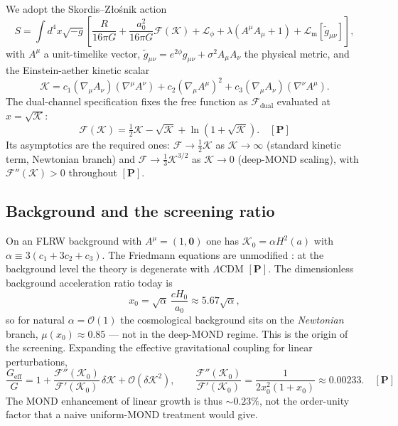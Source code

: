 \documentclass[aps,prd,preprint,superscriptaddress,nofootinbib,amsmath,amssymb,floatfix]{revtex4-2}
\makeatletter
\DeclareRobustCommand{\_}{%
    \ifmmode\nfss@text{\textunderscore}\else\textunderscore\penalty\z@\fi}%
\makeatother
\begin{document}
We adopt the Skordis--Z\l{}o\'snik action \cite{SkordisZlosnik2021}
\begin{equation}
\label{eq:rmond}
S = \int d^4x\sqrt{-g}\left[\frac{R}{16\pi G} + \frac{a_0^2}{16\pi G}\mathcal{F}(\mathcal{K}) + \mathcal{L}_\phi + \lambda(A^\mu A_\mu + 1) + \mathcal{L}_{\text{m}}[\tilde g_{\mu\nu}]\right],
\end{equation}
with $A^\mu$ a unit-timelike vector, $\tilde g_{\mu\nu} = e^{2\phi}g_{\mu\nu} + \sigma^2 A_\mu A_\nu$ the physical metric, and the Einstein-aether kinetic scalar
\begin{equation}
\mathcal{K} = c_1(\nabla_\mu A_\nu)(\nabla^\mu A^\nu) + c_2(\nabla_\mu A^\mu)^2 + c_3(\nabla_\mu A_\nu)(\nabla^\nu A^\mu).
\end{equation}
The dual-channel specification fixes the free function as $\mathcal{F}_{\text{dual}}$ evaluated at $x = \sqrt{\mathcal{K}}$:
\begin{equation}
\label{eq:Fk}
\mathcal{F}(\mathcal{K}) = \tfrac{1}{2}\mathcal{K} - \sqrt{\mathcal{K}} + \ln\!\left(1+\sqrt{\mathcal{K}}\right). \quad \mathbf{[P]}
\end{equation}
Its asymptotics are the required ones: $\mathcal{F}\to\tfrac{1}{2}\mathcal{K}$ as $\mathcal{K}\to\infty$ (standard kinetic term, Newtonian branch) and $\mathcal{F}\to\tfrac{1}{3}\mathcal{K}^{3/2}$ as $\mathcal{K}\to0$ (deep-MOND scaling), with $\mathcal{F}''(\mathcal{K})>0$ throughout $\mathbf{[P]}$.

\subsection{Background and the screening ratio}

On an FLRW background with $A^\mu = (1,\mathbf{0})$ one has $\mathcal{K}_0 = \alpha H^2(a)$ with $\alpha \equiv 3(c_1+3c_2+c_3)$. The Friedmann equations are unmodified \cite{Thomas2023}: at the background level the theory is degenerate with $\Lambda$CDM $\mathbf{[P]}$. The dimensionless background acceleration ratio today is
\begin{equation}
x_0 = \sqrt{\alpha}\,\frac{cH_0}{a_0} \approx 5.67\sqrt{\alpha},
\end{equation}
so for natural $\alpha = \mathcal{O}(1)$ the cosmological background sits on the \emph{Newtonian} branch, $\mu(x_0)\approx0.85$ --- not in the deep-MOND regime. This is the origin of the screening. Expanding the effective gravitational coupling for linear perturbations,
\begin{equation}
\frac{G_{\text{eff}}}{G} = 1 + \frac{\mathcal{F}''(\mathcal{K}_0)}{\mathcal{F}'(\mathcal{K}_0)}\,\delta\mathcal{K} + \mathcal{O}(\delta\mathcal{K}^2),
\qquad \frac{\mathcal{F}''(\mathcal{K}_0)}{\mathcal{F}'(\mathcal{K}_0)} = \frac{1}{2x_0^2(1+x_0)} \approx 0.00233 . \quad \mathbf{[P]}
\end{equation}
The MOND enhancement of linear growth is thus $\sim0.23\%$, not the order-unity factor that a naive uniform-MOND treatment would give.
\end{document}
